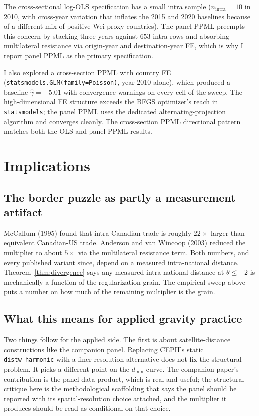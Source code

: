 \documentclass[11pt, letterpaper]{article}
\theoremstyle{definition}
\begin{document}
The cross-sectional log-OLS specification has a small intra sample
($n_{\text{intra}} = 10$ in 2010, with cross-year variation that
inflates the 2015 and 2020 baselines because of a different mix of
positive-Wei-proxy countries). The panel PPML preempts this concern by
stacking three years against $653$ intra rows and absorbing
multilateral resistance via origin-year and destination-year FE,
which is why I report panel PPML as the primary specification.

I also explored a cross-section PPML with country FE
(\texttt{statsmodels.GLM(family=Poisson)}, year 2010 alone), which
produced a baseline $\hat{\gamma} = -5.01$ with convergence warnings on
every cell of the sweep. The high-dimensional FE structure exceeds the
BFGS optimizer's reach in \texttt{statsmodels}; the panel PPML uses
the dedicated alternating-projection algorithm
\citep{correia_guimaraes_zylkin_2020} and converges cleanly.
The cross-section PPML directional pattern matches both the OLS and
panel PPML results.

\section{Implications}
\label{sec:implications}

\subsection{The border puzzle as partly a measurement artifact}

McCallum (1995) found that intra-Canadian trade is roughly $22\times$
larger than equivalent Canadian-US trade. Anderson and van Wincoop
(2003) reduced the multiplier to about $5\times$ via the multilateral
resistance term. Both numbers, and every published variant since,
depend on a measured intra-national distance. Theorem~\ref{thm:divergence}
says any measured intra-national distance at $\theta \leq -2$ is
mechanically a function of the regularization grain. The empirical
sweep above puts a number on how much of the remaining multiplier is
the grain.

\subsection{What this means for applied gravity practice}

Two things follow for the applied side. The first is about
satellite-distance constructions like the companion
\citet{gonchar_helfrich_2026} panel. Replacing CEPII's static
\texttt{distw\_harmonic} with a finer-resolution alternative does
not fix the structural problem. It picks a different point on the
$d_{\min}$ curve. The companion paper's contribution is the panel
data product, which is real and useful; the structural critique
here is the methodological scaffolding that says the panel should
be reported with its spatial-resolution choice attached, and the
multiplier it produces should be read as conditional on that choice.
\end{document}

